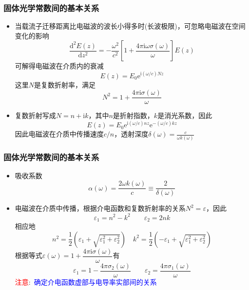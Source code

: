 \frame
{
	\frametitle{固体光学常数间的基本关系}
	\begin{itemize}
		\item 当载流子迁移距离比电磁波的波长小得多时(长波极限)，可忽略电磁波在空间变化的影响
			\begin{displaymath}
				\frac{\mathrm{d}^2E(z)}{\mathrm{d}z^2}=-\frac{\omega^2}{c^2}\left[ 1+\frac{4\pi\mathrm{i}\omega\sigma(\omega)}{\omega} \right]E(z)
			\end{displaymath}
		可解得电磁波在介质内的衰减
		\begin{displaymath}
			E(z)=E_0\mathrm{e}^{\mathrm{i}(\omega/c)Nz}
		\end{displaymath}
		这里$N$是复数折射率，满足
		\begin{displaymath}
			N^2=1+\frac{4\pi\mathrm{i}\sigma(\omega)}{\omega} 
		\end{displaymath}
		\item 复数折射写成$N=n+\mathrm{i}k$，其中$n$是折射指数，$k$是消光系数，因此
			\begin{displaymath}
				E(z)=E_0\mathrm{e}^{\mathrm{i}(\omega/c)nz}\mathrm{e}^{-(\omega/c)kz}
			\end{displaymath}
			因此电磁波在介质中传播速度$c/n$，透射深度$\delta(\omega)=\frac{c}{\omega k(\omega)}$
	\end{itemize}
}

\frame
{
	\frametitle{固体光学常数间的基本关系}
	\begin{itemize}
		\item 吸收系数
			\begin{displaymath}
				\alpha(\omega)=\frac{2\omega k(\omega)}c\equiv\frac2{\delta(\omega)}
			\end{displaymath}
		\item 电磁波在介质中传播，根据介电函数和复数折射率的关系$N^2=\varepsilon$，因此
			\begin{displaymath}
				\varepsilon_1=n^2-k^2\qquad\varepsilon_2=2nk
			\end{displaymath}
			相应地
			\begin{displaymath}
				n^2=\frac12(\varepsilon_1+\sqrt{\varepsilon_1^2+\varepsilon_2^2})\quad k^2=\frac12(-\varepsilon_1+\sqrt{\varepsilon_1^2+\varepsilon_2^2})
			\end{displaymath}
			根据等式$\varepsilon(\omega)=1+\dfrac{4\pi\mathrm{i}\sigma(\omega)}{\omega}$有
			\begin{displaymath}
				\varepsilon_1=1-\frac{4\pi\sigma_2(\omega)}{\omega}\qquad\varepsilon_2=\frac{4\pi\sigma_1(\omega)}{\omega} 
			\end{displaymath}
			\textcolor{red}{注意}:~\textcolor{blue}{确定介电函数虚部与电导率实部间的关系}
	\end{itemize}
}

